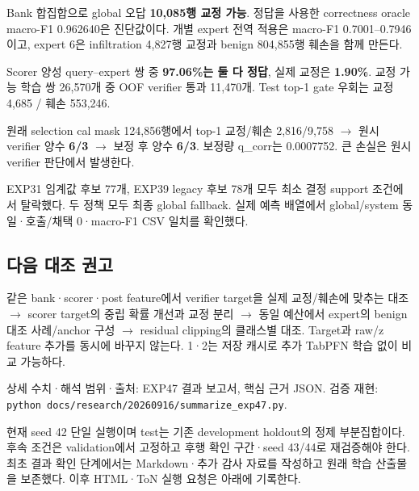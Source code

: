 \par\noindent \textbullet\enspace Bank 합집합으로 global 오답 \textbf{10,085행 교정 가능}. 정답을 사용한 correctness oracle macro-F1 0.962640은 진단값이다. 개별 expert 전역 적용은 macro-F1 0.7001–0.7946이고, expert 6은 infiltration 4,827행 교정과 benign 804,855행 훼손을 함께 만든다.


\par\noindent \textbullet\enspace Scorer 양성 query–expert 쌍 중 \textbf{97.06\%는 둘 다 정답}, 실제 교정은 \textbf{1.90\%}. 교정 가능 학습 쌍 26,570개 중 OOF verifier 통과 11,470개. Test top-1 gate 우회는 교정 4,685 /\allowbreak{} 훼손 553,246.


\par\noindent \textbullet\enspace 원래 selection cal mask 124,856행에서 top-1 교정/\allowbreak{}훼손 2,816/\allowbreak{}9,758  \ensuremath{\rightarrow}  원시 verifier 양수 \textbf{6/\allowbreak{}3}  \ensuremath{\rightarrow}  보정 후 양수 \textbf{6/\allowbreak{}3}. 보정량 q\_\allowbreak{}corr는 0.0007752. 큰 손실은 원시 verifier 판단에서 발생한다.


\par\noindent \textbullet\enspace EXP31 임계값 후보 77개, EXP39 legacy 후보 78개 모두 최소 결정 support 조건에서 탈락했다. 두 정책 모두 최종 global fallback. 실제 예측 배열에서 global/\allowbreak{}system 동일·호출/\allowbreak{}채택 0·macro-F1 CSV 일치를 확인했다.


\subsection{다음 대조 권고}
같은 bank·scorer·post feature에서 verifier target을 실제 교정/\allowbreak{}훼손에 맞추는 대조  \ensuremath{\rightarrow}  scorer target의 중립 확률 개선과 교정 분리  \ensuremath{\rightarrow}  동일 예산에서 expert의 benign 대조 사례/\allowbreak{}anchor 구성  \ensuremath{\rightarrow}  residual clipping의 클래스별 대조. Target과 raw/\allowbreak{}z feature 추가를 동시에 바꾸지 않는다. 1·2는 저장 캐시로 추가 TabPFN 학습 없이 비교 가능하다.

상세 수치·해석 범위·출처: EXP47 결과 보고서, 핵심 근거 JSON. 검증 재현: \texttt{python d\allowbreak{}ocs/\allowbreak{}\allowbreak{}rese\allowbreak{}arch/\allowbreak{}\allowbreak{}202\allowbreak{}60916/\allowbreak{}\allowbreak{}su\allowbreak{}mmarize\_\allowbreak{}\allowbreak{}exp47.\allowbreak{}py\allowbreak{}}.

현재 seed 42 단일 실행이며 test는 기존 development holdout의 정제 부분집합이다. 후속 조건은 validation에서 고정하고 후행 확인 구간·seed 43/\allowbreak{}44로 재검증해야 한다. 최초 결과 확인 단계에서는 Markdown·추가 감사 자료를 작성하고 원래 학습 산출물을 보존했다. 이후 HTML·ToN 실행 요청은 아래에 기록한다.

